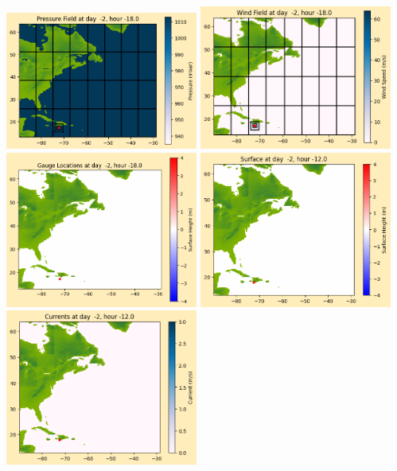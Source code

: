 \documentclass[11pt]{article}
\begin{document}
\includegraphics[width=0.475\textwidth]{frame0001fig1012.png}
\vskip 10pt 
\includegraphics[width=0.475\textwidth]{frame0001fig1013.png}
\includegraphics[width=0.475\textwidth]{frame0001fig1014.png}
\vskip 10pt 
\includegraphics[width=0.475\textwidth]{frame0002fig1001.png}
\includegraphics[width=0.475\textwidth]{frame0002fig1002.png}
\end{document}
